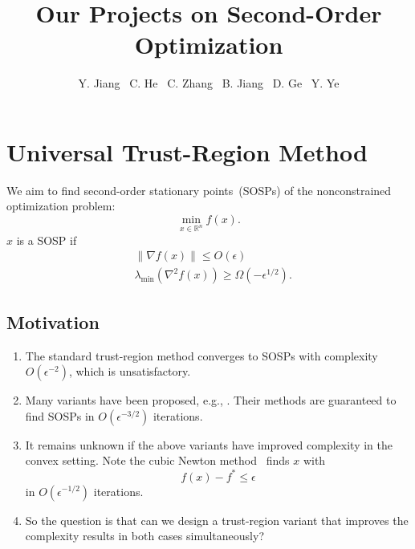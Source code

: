 \documentclass{mcom-l}
\numberwithin{equation}{section}
\begin{document}
\title{Our Projects on Second-Order Optimization}


\author{Y. Jiang \ C. He \ C. Zhang \ B. Jiang \ D. Ge \ Y. Ye}





\maketitle
\section{Universal Trust-Region Method}
We aim to find second-order stationary points~(SOSPs) of the nonconstrained optimization problem:
\begin{equation*}
    \min_{x\in \mathbb{R}^n} f(x).
\end{equation*}
$x$ is a SOSP if
\begin{align*}
     & \|\nabla f(x) \| \leq O(\epsilon)                            \\
     & \lambda_{\min}(\nabla ^2 f(x)) \geq \Omega(-\epsilon^{1/2}).
\end{align*}
\subsection{Motivation}
\begin{enumerate}
    \item The standard trust-region method converges to SOSPs with complexity $O(\epsilon^{-2})$, which is unsatisfactory.
    \item Many variants have been proposed, e.g., \citet{luenberger_linear_2021,curtis2021trust,curtis2017trust,hamad2022consistently}. Their methods are guaranteed to find SOSPs in $O(\epsilon^{-3/2})$ iterations.
    \item It remains unknown if the above variants have improved complexity in the convex setting. Note the cubic Newton method~\citet{nesterov2006cubic} finds $x$ with
          \begin{equation*}
              f(x) - f^* \leq \epsilon
          \end{equation*}
          in $O(\epsilon^{-1/2})$ iterations.
    \item So the question is that can we design a trust-region variant that improves the complexity results in both cases simultaneously?
\end{enumerate}
\end{document}
